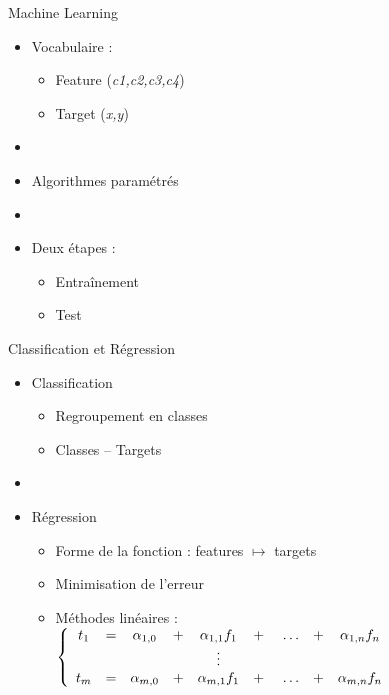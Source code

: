 \documentclass{beamer}
\begin{document}
\begin{frame}{Machine Learning}
  \begin{itemize}
    \item Vocabulaire :
    \begin{itemize}
      \item Feature (\textit{c1,c2,c3,c4})
      \item Target (\textit{x,y})
    \end{itemize}
    \item[]
    \item Algorithmes paramétrés
    \item[]
    \item Deux étapes :
    \begin{itemize}
      \item Entraînement
      \item Test
    \end{itemize}
  \end{itemize}
\end{frame}

\begin{frame}{Classification et Régression}
  \begin{itemize}
    \item Classification
    \begin{itemize}
      \item Regroupement en classes
      \item Classes -- Targets
    \end{itemize}
    \item[]
    \item Régression
    \begin{itemize}
      \item Forme de la fonction : features $\mapsto$ targets
      \item Minimisation de l'erreur
      \item Méthodes linéaires :
      \begin{math}
        \left\{
        \begin{array}{c c c c c cccc}
          t_1 &=& \alpha_{1,0} &+& \alpha_{1,1}f_1 &+& \dots &+& \alpha_{1,n}f_n\\
          &&&&\vdots\\
          t_m &=& \alpha_{m,0} &+& \alpha_{m,1}f_1 &+& \dots &+& \alpha_{m,n}f_n
        \end{array}
        \right.
      \end{math}
    \end{itemize}
  \end{itemize}
\end{frame}
\end{document}
